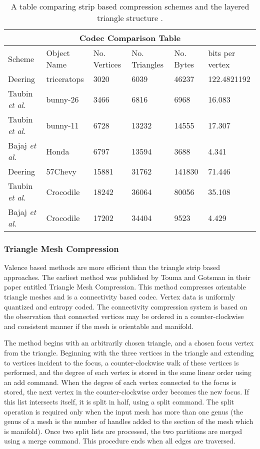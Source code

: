 \begin{table}[!t]
\begin{tabular}[c]{|l|l|l|l|l|l|}
\hline
\multicolumn{6}{|c|}{Codec Comparison Table}\\
\hline
Scheme & Object Name & No. Vertices & No. Triangles & No. Bytes & bits per vertex\\
\hline
Deering & triceratops & 3020 & 6039 & 46237 & 122.4821192\\
Taubin \textit{et al.} & bunny-26 & 3466 & 6816 & 6968 & 16.083\\
Taubin \textit{et al.} & bunny-11 & 6728 & 13232 & 14555 & 17.307\\
Bajaj \textit{et al.} & Honda & 6797 & 13594 & 3688 & 4.341\\
Deering & 57Chevy & 15881 & 31762 & 141830 & 71.446\\
Taubin \textit{et al.} & Crocodile & 18242 & 36064 & 80056 & 35.108\\
Bajaj \textit{et al.} & Crocodile & 17202 & 34404 & 9523 & 4.429\\
\hline
\end{tabular}
\caption{A table comparing strip based compression schemes \cite{Deering95Geometry,Taubin98Geometric} and the layered triangle structure \cite{Bajaj99SingleRate}.}
\label{table:schemeComparisonTable1}
\end{table}

\subsubsection{Triangle Mesh Compression}

Valence based methods are more efficient than the triangle strip based approaches. The earliest method was published by Touma and Gotsman \cite{touma98triangle} in their paper entitled Triangle Mesh Compression. This method compresses orientable triangle meshes and is a connectivity based codec. Vertex data is uniformly quantized and entropy coded. The connectivity compression system is based on the observation that connected vertices may be ordered in a counter-clockwise and consistent manner if the mesh is orientable and manifold. 

The method begins with an arbitrarily chosen triangle, and a chosen focus vertex from the triangle. Beginning with the three vertices in the triangle and extending to vertices incident to the focus, a counter-clockwise walk of these vertices is performed, and the degree of each vertex is stored in the same linear order using an add command. When the degree of each vertex connected to the focus is stored, the next vertex in the counter-clockwise order becomes the new focus. If this list intersects itself, it is split in half, using a split command. The split operation is required only when the input mesh has more than one genus (the genus of a mesh is the number of handles added to the section of the mesh which is manifold). Once two split lists are processed, the two partitions are merged using a merge command. This procedure ends when all edges are traversed.

